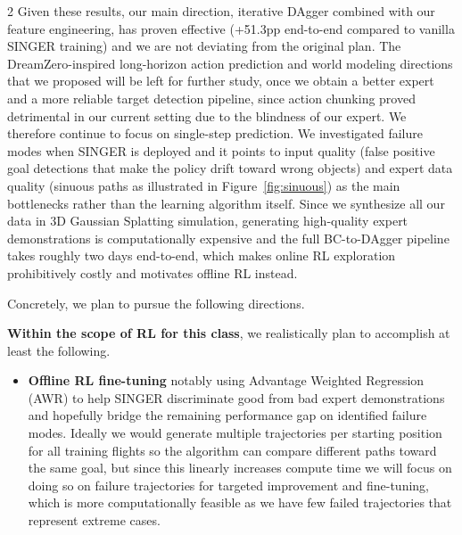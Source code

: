\documentclass{article}
\begin{document}
\begin{multicols}{2}
Given these results, our main direction, iterative DAgger combined with our feature engineering, has proven effective (+51.3pp end-to-end compared to vanilla SINGER training) and we are not deviating from the original plan. The DreamZero-inspired long-horizon action prediction and world modeling directions that we proposed will be left for further study, once we obtain a better expert and a more reliable target detection pipeline, since action chunking proved detrimental in our current setting due to the blindness of our expert. We therefore continue to focus on single-step prediction. We investigated failure modes when SINGER is deployed and it points to input quality (false positive goal detections that make the policy drift toward wrong objects) and expert data quality (sinuous paths as illustrated in Figure~\ref{fig:sinuous}) as the main bottlenecks rather than the learning algorithm itself. Since we synthesize all our data in 3D Gaussian Splatting simulation, generating high-quality expert demonstrations is computationally expensive and the full BC-to-DAgger pipeline takes roughly two days end-to-end, which makes online RL exploration prohibitively costly and motivates offline RL instead.

Concretely, we plan to pursue the following directions.

\textbf{Within the scope of RL for this class}, we realistically plan to accomplish at least the following.
\begin{itemize}
\item \textbf{Offline RL fine-tuning} notably using Advantage Weighted Regression (AWR) to help SINGER discriminate good from bad expert demonstrations and hopefully bridge the remaining performance gap on identified failure modes. Ideally we would generate multiple trajectories per starting position for all training flights so the algorithm can compare different paths toward the same goal, but since this linearly increases compute time we will focus on doing so on failure trajectories for targeted improvement and fine-tuning, which is more computationally feasible as we have few failed trajectories that represent extreme cases.
\end{itemize}


\end{multicols}
\end{document}
